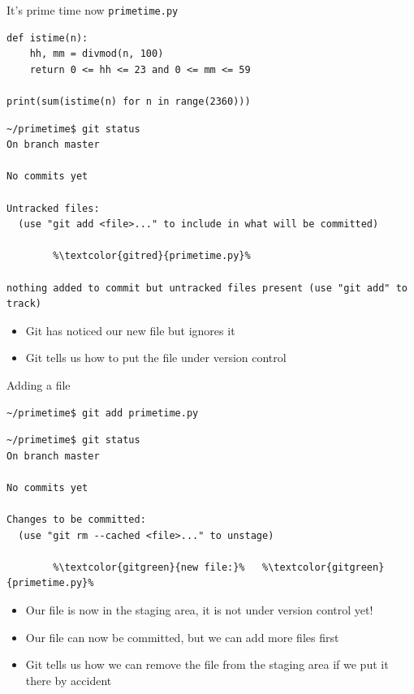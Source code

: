 \documentclass[svgnames]{beamer}
\begin{document}
\begin{frame}[fragile]{It's prime time now}
 \texttt{primetime.py}
 \begin{lstlisting}
def istime(n):
    hh, mm = divmod(n, 100)
    return 0 <= hh <= 23 and 0 <= mm <= 59

print(sum(istime(n) for n in range(2360)))
 \end{lstlisting}

 \vspace{0.2truecm}
 \begin{lstlisting}[breaklines=true
                    ,escapechar=\%]
~/primetime$ git status
On branch master

No commits yet

Untracked files:
  (use "git add <file>..." to include in what will be committed)

        %\textcolor{gitred}{primetime.py}%

nothing added to commit but untracked files present (use "git add" to track)
 \end{lstlisting}
 \begin{itemize}
  \item Git has noticed our new file but ignores it
  \item Git tells us how to put the file under version control
 \end{itemize}
\end{frame}

\begin{frame}[fragile]{Adding a file}
 \begin{lstlisting}
~/primetime$ git add primetime.py
 \end{lstlisting}

 \vspace{0.2truecm}
 \begin{lstlisting}[escapechar=\%]
~/primetime$ git status
On branch master

No commits yet

Changes to be committed:
  (use "git rm --cached <file>..." to unstage)

        %\textcolor{gitgreen}{new file:}%   %\textcolor{gitgreen}{primetime.py}%
 \end{lstlisting}
 \begin{itemize}
  \item Our file is now in the staging area, \alert{it is not under version control yet!}
  \item Our file can now be committed, but we can add more files first
  \item Git tells us how we can remove the file from the staging area if we put
        it there by accident
 \end{itemize}
\end{frame}
\end{document}
